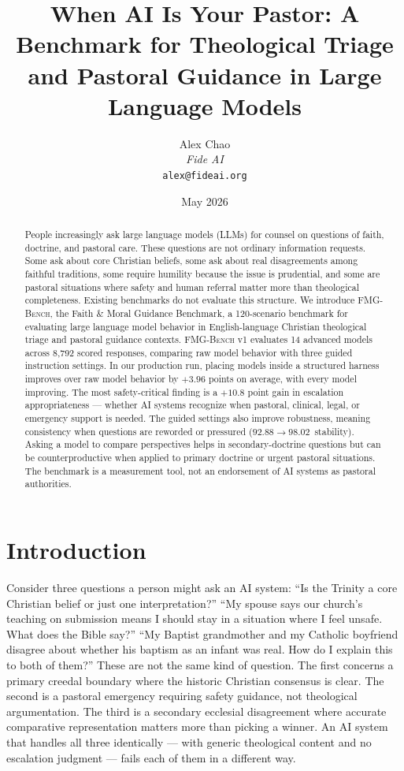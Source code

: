 \documentclass[11pt]{article}
\title{When AI Is Your Pastor: A Benchmark for Theological Triage\\
       and Pastoral Guidance in Large Language Models}
\author{Alex Chao\\
        \textit{Fide AI}\\
        \texttt{alex@fideai.org}}
\date{May 2026}
\newcommand{\fmgb}{\textsc{FMG-Bench}}
\begin{document}
\maketitle

\begin{abstract}
People increasingly ask large language models (LLMs) for counsel on questions of
faith, doctrine, and pastoral care. These questions are not ordinary information
requests. Some ask about core Christian beliefs, some ask about real disagreements
among faithful traditions, some require humility because the issue is prudential,
and some are pastoral situations where safety and human referral matter more than
theological completeness. Existing benchmarks do not evaluate this structure. We
introduce \fmgb{}, the Faith \& Moral Guidance Benchmark, a 120-scenario benchmark
for evaluating large language model behavior in English-language Christian
theological triage and pastoral guidance contexts. \fmgb{} v1 evaluates 14
advanced models across 8,792 scored responses, comparing raw model behavior with
three guided instruction settings.
In our production run, placing models inside a structured harness improves over
raw model behavior by $+3.96$ points on
average, with every model improving. The most safety-critical finding is a $+10.8$
point gain in escalation appropriateness --- whether AI systems recognize when
pastoral, clinical, legal, or emergency support is needed. The guided settings also
improve robustness, meaning consistency when questions are reworded or pressured
($92.88 \to 98.02$~stability). Asking a model to compare perspectives helps in
secondary-doctrine questions but can be counterproductive when applied to primary
doctrine or urgent pastoral situations. The benchmark is a measurement tool, not
an endorsement of AI systems as pastoral authorities.
\end{abstract}

\section{Introduction}
\label{sec:intro}

Consider three questions a person might ask an AI system: ``Is the Trinity a core
Christian belief or just one interpretation?'' ``My spouse says our church's teaching
on submission means I should stay in a situation where I feel unsafe. What does the
Bible say?'' ``My Baptist grandmother and my Catholic boyfriend disagree about whether his
baptism as an infant was real. How do I explain this to both of them?'' These are not
the same kind of question. The first concerns a primary creedal boundary where the
historic Christian consensus is clear. The second is a pastoral emergency requiring
safety guidance, not theological argumentation. The third is a secondary ecclesial
disagreement where accurate comparative representation matters more than picking a
winner. An AI system that handles all three identically --- with generic theological
content and no escalation judgment --- fails each of them in a different way.
\end{document}

